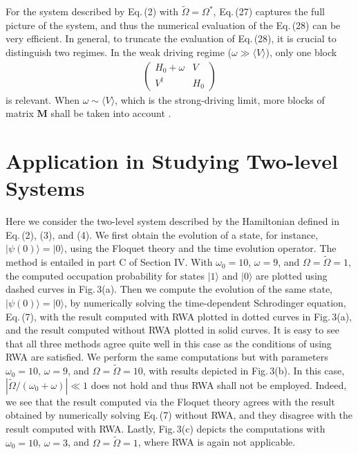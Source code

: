 \documentclass[reprint, amsmath, amssymb, aps]{revtex4-2}
\newcommand{\that}[1]{\widetilde{#1}}
\begin{document}
For the system described by Eq.\,(2) with $\that{\Omega} = \Omega^*$, Eq.\,(27) captures the full picture of the system, and thus the numerical evaluation of the Eq.\,(28) can be very efficient. In general, to truncate the evaluation of Eq.\,(28), it is crucial to distinguish two regimes. In the weak driving regime ($\omega\gg \langle V\rangle$), only one block 
\begin{align*}
\begin{pmatrix}
H_0+\omega & V \\ V^\dagger& H_0
\end{pmatrix}
\end{align*}
is relevant. When $\omega \sim \langle V\rangle$, which is the strong-driving limit, more blocks of matrix $\mathbf{M}$ shall be taken into account \cite{Viebahn}. 

\section{Application in Studying Two-level Systems}
Here we consider the two-level system described by the Hamiltonian defined in Eq.\,(2), (3), and (4). We first obtain the evolution of a state, for instance, $|\psi(0)\rangle =  |0\rangle$, using the Floquet theory and the time evolution operator. The method is entailed in part C of Section IV. With $\omega_0 = 10$, $\omega = 9$, and $\Omega =\that{\Omega} = 1$, the computed occupation probability for states $|1\rangle$ and $|0\rangle$ are plotted using dashed curves in Fig.\,3(a). Then we compute the evolution of the same state, $|\psi(0)\rangle =  |0\rangle$, by numerically solving the time-dependent Schrodinger equation, Eq.\,(7), with the result computed with RWA plotted in dotted curves in Fig.\,3(a), and the result computed without RWA plotted in solid curves. It is easy to see that all three methods agree quite well in this case as the conditions of using RWA are satisfied. We perform the same computations but with parameters $\omega_0 = 10$, $\omega = 9$, and $\Omega= \that{\Omega} = 10$, with results depicted in Fig.\,3(b). In this case, $|\that{\Omega}/(\omega_0+\omega)| \ll 1$ does not hold and thus RWA shall not be employed. Indeed, we see that the result computed via the Floquet theory agrees with the result obtained by numerically solving Eq.\,(7) without RWA, and they disagree with the result computed with RWA. Lastly, Fig.\,3(c) depicts the computations with $\omega_0 = 10$, $\omega = 3$, and $\Omega= \that{\Omega} = 1$, where RWA is again not applicable. \\
\end{document}
